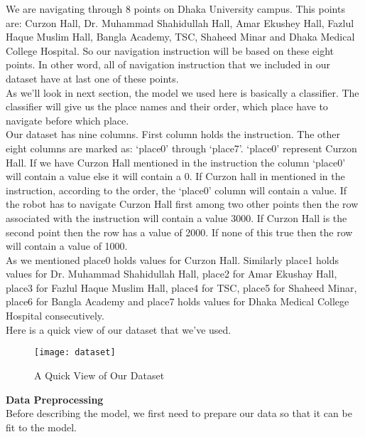 We are navigating through 8 points on Dhaka University campus. This points are: Curzon Hall, Dr. Muhammad Shahidullah Hall, Amar Ekushey Hall, Fazlul Haque Muslim Hall, Bangla Academy, TSC, Shaheed Minar and Dhaka Medical College Hospital. So our navigation instruction will be based on these eight points. In other word, all of navigation instruction that we included in our dataset have at last one of these points. \\

As we'll look in next section, the model we used here is basically a classifier. The classifier will give us the place names and their order, which place have to navigate before which place.\\

Our dataset has nine columns. First column holds the instruction. The other eight columns are marked as: `place0' through `place7'. `place0' represent Curzon Hall. If we have Curzon Hall mentioned in the instruction the column `place0' will contain a value else it will contain a 0. If Curzon hall in mentioned in the instruction, according to the order, the `place0' column will contain a value. If the robot has to navigate Curzon Hall first among two other points then the row associated with the instruction will contain a value 3000. If Curzon Hall is the second point then the row has a value of 2000. If none of this true then the row will contain a value of 1000. \\

As we mentioned place0 holds values for Curzon Hall. Similarly place1 holds values for Dr. Muhammad Shahidullah Hall, place2 for Amar Ekushay Hall, place3 for Fazlul Haque Muslim Hall, place4 for TSC, place5 for Shaheed Minar, place6 for Bangla Academy and place7 holds values for Dhaka Medical College Hospital consecutively. \\

Here is a quick view of our dataset that we've used. \\

\begin{figure}[h]
    \centering
    \texttt{[image: dataset]}
    
    \caption{A Quick View of Our Dataset}
\end{figure}
\vline

\textbf{Data Preprocessing} \\
Before describing the model, we first need to prepare our data so that it can be fit to the model. \\

